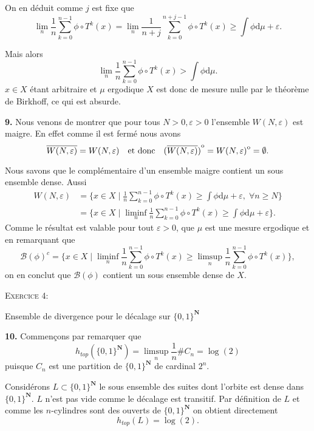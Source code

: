 \documentclass[12pt]{article}
\newenvironment{ex}[1]
{\begin{mdframed}[linewidth=0.6pt]
        \textsc{Exercice #1:}

}
    {\end{mdframed}}
\newcommand{\N}{\mathbf{N}}
\newcommand{\de}{\mathrm{d}}
\newcommand{\interior}[1]{%
  {\kern0pt#1}^{\mathrm{o}}%
}
\begin{document}
On en déduit comme $j$ est fixe que \[
        \lim_{n}\frac{1}{n}\sum_{k=0}^{n-1} \phi\circ T^{k}(x) = \lim_{n}\frac{1}{n+j}\sum_{k=0}^{n+j-1} \phi\circ T^{k}(x) \ge \int\phi\de\mu + \varepsilon
.\] 

Mais alors \[
\lim_{n}\frac{1}{n}\sum_{k=0}^{n-1} \phi\circ T^{k}(x) > \int\phi\de\mu 
.\] $x \in X$ étant arbitraire et $\mu$ ergodique $X$ est donc de mesure nulle par le théorème de Birkhoff, ce qui est absurde. 

\bigskip

\textbf{9.} Nous venons de montrer que pour tous $N >0, \varepsilon > 0$ l'ensemble $W(N,\varepsilon)$ est maigre. En effet comme il est fermé nous avons  \[
        \overline{W(N,\varepsilon)} = W(N,\varepsilon) \quad \text{et donc} \quad \interior{(\overline{W(N,\varepsilon)})} = \interior{W(N,\varepsilon)} = \emptyset 
.\] 

Nous savons que le complémentaire d'un ensemble maigre contient un sous ensemble dense. Aussi
\begin{align*}
        W(N, \varepsilon) &= \{x\in X \;|\; \frac{1}{n}\sum_{k=0}^{n-1} \phi\circ T^{k}(x) \ge \int\phi\de\mu + \varepsilon, \; \forall n \ge N\} \\
                          &= \{x \in X \;|\; \liminf_{n} \frac{1}{n}\sum_{k=0}^{n-1} \phi\circ T^{k}(x) \ge \int\phi\de\mu + \varepsilon\}
.\end{align*}
Comme le résultat est valable pour tout $\varepsilon > 0$, que $\mu$ est une mesure ergodique et en remarquant que  \[
        \mathcal{B}(\phi)^{c} = \{x\in X \;|\; \liminf_{n}\frac{1}{n}\sum_{k=0}^{n-1} \phi\circ T^{k}(x) \ge \limsup_{n} \frac{1}{n}\sum_{k=0}^{n-1} \phi\circ T^{k}(x)\} 
,\] on en conclut que $\mathcal{B}(\phi)$ contient un sous ensemble dense de $X$. 

\bigskip

\begin{ex}{4}
       Ensemble de divergence pour le décalage sur $\{0,1\}^{\N}$ 
\end{ex}

\textbf{10.} Commençons par remarquer que \[
        h_{top}(\{0,1\}^{\N}) = \limsup_{n}\frac{1}{n}\#C_{n} = \log(2)
\] puisque $C_{n}$ est une partition de $\{0,1\}^{\N}$ de cardinal $2^{n}$. 

Considérons $L \subset \{0,1\}^{\N}$ le sous ensemble des suites dont l'orbite est dense dans $\{0,1\}^{\N}$. $L$ n'est pas vide comme le décalage est transitif. Par définition de $L$ et comme les $n$-cylindres sont des ouverts de $\{0,1\}^{\N}$ on obtient directement \[
        h_{top}(L) = \log(2)
.\] 
\end{document}
